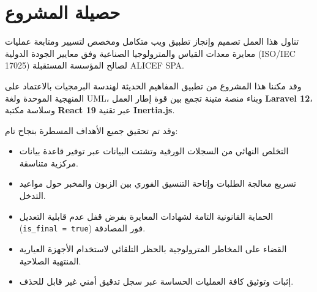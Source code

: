 \documentclass{bts-report-ar}
\begin{document}

\section*{حصيلة المشروع}
تناول هذا العمل تصميم وإنجاز تطبيق ويب متكامل ومخصص لتسيير ومتابعة عمليات معايرة معدات القياس والمترولوجيا الصناعية وفق معايير الجودة الدولية (ISO/IEC 17025) لصالح المؤسسة المستقبلة ALICEF SPA.

وقد مكننا هذا المشروع من تطبيق المفاهيم الحديثة لهندسة البرمجيات بالاعتماد على المنهجية الموحدة ولغة UML، وبناء منصة متينة تجمع بين قوة إطار العمل \textbf{Laravel 12}، وسلاسة مكتبة \textbf{React 19} عبر تقنية \textbf{Inertia.js}.

وقد تم تحقيق جميع الأهداف المسطرة بنجاح تام:
\begin{itemize}
  \item التخلص النهائي من السجلات الورقية وتشتت البيانات عبر توفير قاعدة بيانات مركزية متناسقة.
  \item تسريع معالجة الطلبات وإتاحة التنسيق الفوري بين الزبون والمخبر حول مواعيد التدخل.
  \item الحماية القانونية التامة لشهادات المعايرة بفرض قفل عدم قابلية التعديل (\texttt{is\_final = true}) فور المصادقة.
  \item القضاء على المخاطر المترولوجية بالحظر التلقائي لاستخدام الأجهزة العيارية المنتهية الصلاحية.
  \item إثبات وتوثيق كافة العمليات الحساسة عبر سجل تدقيق أمني غير قابل للحذف.
\end{itemize}
\end{document}
